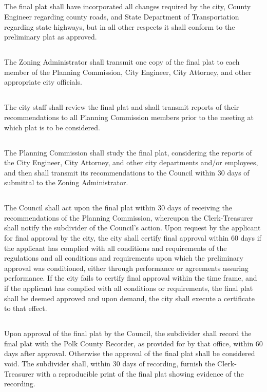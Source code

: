 \subsection{}
The final plat shall have incorporated all changes required by the city, County Engineer regarding county roads, and State Department of Transportation regarding state highways, but in all other respects it shall conform to the preliminary plat as approved.
\subsection{}
The Zoning Administrator shall transmit one copy of the final plat to each member of the Planning Commission, City Engineer, City Attorney, and other appropriate city officials.
\subsection{}
The city staff shall review the final plat and shall transmit reports of their recommendations to all Planning Commission members prior to the meeting at which plat is to be considered.
\subsection{}
The Planning Commission shall study the final plat, considering the reports of the City Engineer, City Attorney, and other city departments and/or employees, and then shall transmit its recommendations to the Council within 30 days of submittal to the Zoning Administrator.
\subsection{}
The Council shall act upon the final plat within 30 days of receiving the recommendations of the Planning Commission, whereupon the Clerk-Treasurer shall notify the subdivider of the Council’s action. Upon request by the applicant for final approval by the city, the city shall certify final approval within 60 days if the applicant has complied with all conditions and requirements of the regulations and all conditions and requirements upon which the preliminary approval was conditioned, either through performance or agreements assuring performance. If the city fails to certify final approval within the time frame, and if the applicant has complied with all conditions or requirements, the final plat shall be deemed approved and upon demand, the city shall execute a certificate to that effect.
\subsection{}
Upon approval of the final plat by the Council, the subdivider shall record the final plat with the Polk County Recorder, as provided for by that office, within 60 days after approval.  Otherwise the approval of the final plat shall be considered void. The subdivider shall, within 30 days of recording, furnish the Clerk-Treasurer with a reproducible print of the final plat showing evidence of the recording.

